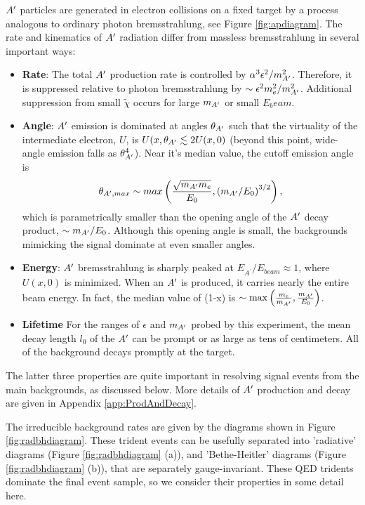 $A^\prime$ particles are generated in electron collisions on a fixed target by a process analogous to ordinary photon bremsstrahlung, see Figure \ref{fig:apdiagram}.  The rate and kinematics of $A^\prime$ radiation differ from massless bremsstrahlung in several important ways:
\begin{itemize}
\item  {\bf Rate}: The total $A^\prime$ production rate is controlled by $\alpha^3\epsilon^2 / m_{A^\prime}^2$.  
 Therefore, it is suppressed relative to photon bremsstrahlung by $\sim \epsilon^2 m_e^2/m_{A^\prime}^2$.  Additional suppression from small $\tilde{\chi}$  occurs for large $m_{A^\prime}$  or small $E_beam$.
\item {\bf Angle}:  $A^\prime$ emission is dominated at angles $\theta_{A^\prime}$ such that the virtuality of the intermediate electron, $U$, is $U(x,\theta_{A^\prime}\lesssim 2 U(x,0)$ (beyond this point, wide-angle emission falls as $\theta_{A^\prime}^4$). Near it's median value, the cutoff emission angle is
\begin{equation}
\theta_{A^\prime,max}\sim max\left(\frac{\sqrt{m_{A^\prime} m_e}}{E_0},\left(m_{A^\prime}/E_0\right)^{3/2}\right),
\end{equation}
which is parametrically smaller than the opening angle of the $A^\prime$ decay product, $\sim  m_{A^\prime}/E_0$.  Although this opening angle is small, the backgrounds mimicking the signal dominate at even smaller angles.
\item {\bf Energy}:  $A^\prime$ bremsstrahlung is sharply peaked at $E_{A^\prime}/E_{beam}\approx 1$, where $U(x,0)$ is minimized.  When an $A^\prime$ is produced, it carries nearly the entire beam energy.  In fact, the median value of (1-x) is $\sim {\rm max}\left(\frac{m_e}{m_{A^\prime}},\frac{m_{A^\prime}}{E_0}\right)$.  
\item{\bf Lifetime} For the ranges of $\epsilon$ and $m_{A^\prime}$ probed by this experiment, the mean decay length $l_0$ of the $A^\prime$ can be prompt or as large as tens of centimeters. All of the background decays promptly at the target.  
\end{itemize}
The  latter three properties are quite important in resolving signal events from the main backgrounds, as discussed
below.   More details of $A^\prime$ production and decay are given in Appendix \ref{app:ProdAndDecay}.

The irreducible background rates are given by the diagrams shown in Figure \ref{fig:radbhdiagram}. These trident events can be usefully separated into 'radiative' diagrams (Figure \ref{fig:radbhdiagram} (a)), and 'Bethe-Heitler' diagrams (Figure \ref{fig:radbhdiagram} (b)), that are separately gauge-invariant.  These QED tridents dominate the final event sample, so we consider their properties in some detail here.

